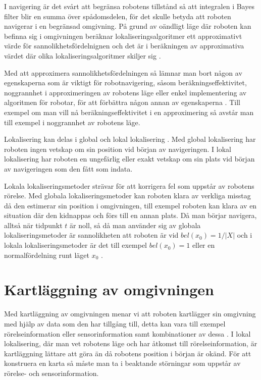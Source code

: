 I navigering är det svårt att begränsa robotens tillstånd så att integralen i Bayes filter blir en summa över spådomsdelen, för det skulle betyda att roboten navigerar i en begränsad omgivning. På grund av oändligt läge där roboten kan befinna sig i omgivningen beräknar lokaliseringsalgoritmer ett approximativt värde för sannolikhetsfördelnignen och det är i beräkningen av approximativa värdet där olika lokaliseringsalgoritmer skiljer sig \citep{ProbabilisticRobotics}.

Med att approximera sannolikhetsfördelningen så lämnar man bort någon av egenskaperna som är viktigt för robotnavigering, såsom beräkningseffektivitet, noggrannhet i approximeringen av robotens läge eller enkel implementering av algoritmen för robotar, för att förbättra någon annan av egenskaperna \citep{ProbabilisticRobotics}. Till exempel om man vill nå beräkningseffektivitet i en approximering så avstår man till exempel i noggrannhet av robotens läge.

Lokalisering kan delas i global och lokal lokalisering \citep{982903, globalsubmaps}. Med global lokalisering har roboten ingen vetskap om sin position vid början av navigeringen. I lokal lokalisering har roboten en ungefärlig eller exakt vetskap om sin plats vid början av navigeringen som den fått som indata. 

Lokala lokaliseringsmetoder strävar för att korrigera fel som uppstår av robotens rörelse. Med globala lokaliseringsmetoder kan roboten klara av verkliga misstag då den estimerar sin position i omgivningen, till exempel roboten kan klara av en situation där den kidnappas och förs till en annan plats. Då man börjar navigera, alltså när tidpunkt $t$ är noll, så då man använder sig av globala lokaliseringsmetoder är sannolikheten att roboten är vid $bel(x_0) = 1 / |X|$ och i lokala lokaliseringsmetoder är det till exempel $bel(x_0) = 1$ eller en normalfördelning runt läget $x_0$ \citep{ProbabilisticRobotics}.

\section{Kartläggning av omgivningen} \label{kartlaggning}

Med kartläggning av omgivningen menar vi att roboten kartlägger sin omgivning med hjälp av data som den har tillgång till, detta kan vara till exempel rörelseinformation eller sensorinformation samt kombinationer av dessa \citep{ProbabilisticRobotics}. I lokal lokalisering, där man vet robotens läge och har åtkomst till rörelseinformation, är kartläggning lättare att göra än då robotens position i början är okänd. För att konstruera en karta så måste man ta i beaktande störningar som uppstår av rörelse- och sensorinformation.

